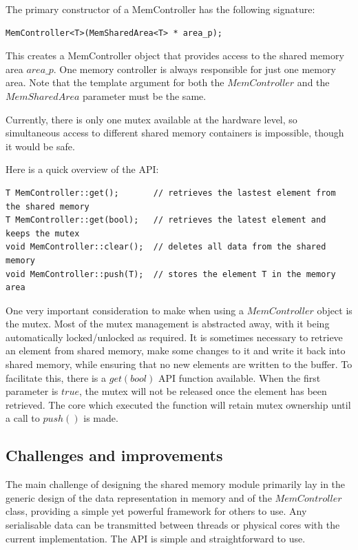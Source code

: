 The primary constructor of a MemController has the following signature:
\begin{lstlisting}
MemController<T>(MemSharedArea<T> * area_p);
\end{lstlisting} 
This creates a MemController object that provides access to the shared memory area $area\_p$. One memory controller is always responsible for just one memory area. Note that the template argument for both the $MemController$ and the $MemSharedArea$ parameter must be the same. 

Currently, there is only one mutex available at the hardware level, so simultaneous access to different shared memory containers is impossible, though it would be safe.

Here is a quick overview of the API:

\begin{lstlisting}
T MemController::get();       // retrieves the lastest element from the shared memory
T MemController::get(bool);   // retrieves the latest element and keeps the mutex
void MemController::clear();  // deletes all data from the shared memory
void MemController::push(T);  // stores the element T in the memory area
\end{lstlisting}

One very important consideration to make when using a $MemController$ object is the mutex. Most of the mutex management is abstracted away, with it being automatically locked/unlocked as required. It is sometimes necessary to retrieve an element from shared memory, make some changes to it and write it back into shared memory, while ensuring that no new elements are written to the buffer. To facilitate this, there is a $get(bool)$ API function available. When the first parameter is $true$, the mutex will not be released once the element has been retrieved. The core which executed the function will retain mutex ownership until a call to $push()$ is made.

\subsection{Challenges and improvements}
The main challenge of designing the shared memory module primarily lay in the generic design of the data representation in memory and of the $MemController$ class, providing a simple yet powerful framework for others to use. Any serialisable data can be transmitted between threads or physical cores with the current implementation. The API is simple and straightforward to use.

